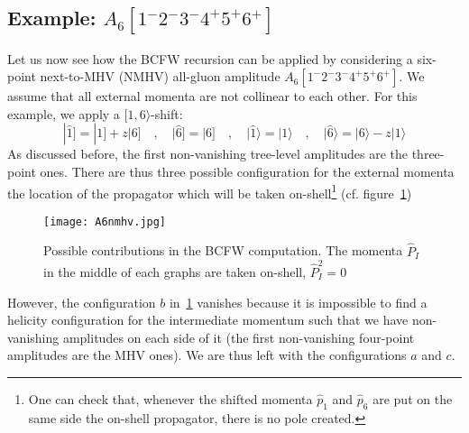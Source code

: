 \subsection{Example: $A_6[1^-2^-3^-4^+5^+6^+]$}
Let us now see how the BCFW recursion can be applied by considering a six-point next-to-MHV (NMHV) all-gluon amplitude $A_6[1^-2^-3^-4^+5^+6^+]$.
We assume that all external momenta are not collinear to each other.
For this example, we apply a $[1,6\rangle$-shift:
\begin{equation*}
|\hat{1}] = |1] + z|6]
\quad,\quad
|\hat{6}] = |6]
\quad,\quad
|\hat{1}\rangle = |1\rangle
\quad,\quad
|\hat{6}\rangle = |6\rangle - z|1\rangle
\end{equation*}
As discussed before, the first non-vanishing tree-level amplitudes are the three-point ones. 
There are thus three possible configuration for the external momenta \wrt the location of the propagator which will be taken on-shell\footnote{One can check that, whenever the shifted momenta $\hat{p}_1$ and $\hat{p}_6$ are put on the same side \wrt the on-shell propagator, there is no pole created.} (cf. figure~\ref{fig_A6nmhv})
\begin{figure}[h]
  \centering
  \texttt{[image: A6nmhv.jpg]}
  \caption{Possible contributions in the BCFW computation. The momenta $\hat{P}_I$ in the middle of each graphs are taken on-shell, \ie $\hat{P}_I^2=0$}
  \label{fig_A6nmhv}
\end{figure}
However, the configuration $b$ in~\ref{fig_A6nmhv} vanishes because it is impossible to find a helicity configuration for the intermediate momentum such that we have non-vanishing amplitudes on each side of it (the first non-vanishing four-point amplitudes are the MHV ones).
We are thus left with the configurations $a$ and $c$.
%
